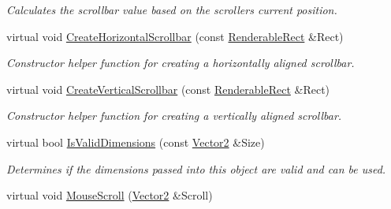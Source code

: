 \begin{DoxyCompactItemize}
\begin{DoxyCompactList}\small\item\em Calculates the scrollbar value based on the scrollers current position. \item\end{DoxyCompactList}\item 
\hypertarget{classphys_1_1UI_1_1Scrollbar_a4c42cf0a45ec4f59c9e6199fc2d3f0e3}{
virtual void \hyperlink{classphys_1_1UI_1_1Scrollbar_a4c42cf0a45ec4f59c9e6199fc2d3f0e3}{CreateHorizontalScrollbar} (const \hyperlink{structphys_1_1UI_1_1RenderableRect}{RenderableRect} \&Rect)}
\label{classphys_1_1UI_1_1Scrollbar_a4c42cf0a45ec4f59c9e6199fc2d3f0e3}

\begin{DoxyCompactList}\small\item\em Constructor helper function for creating a horizontally aligned scrollbar. \item\end{DoxyCompactList}\item 
\hypertarget{classphys_1_1UI_1_1Scrollbar_a762ec4462368f3921b0646b0edae7278}{
virtual void \hyperlink{classphys_1_1UI_1_1Scrollbar_a762ec4462368f3921b0646b0edae7278}{CreateVerticalScrollbar} (const \hyperlink{structphys_1_1UI_1_1RenderableRect}{RenderableRect} \&Rect)}
\label{classphys_1_1UI_1_1Scrollbar_a762ec4462368f3921b0646b0edae7278}

\begin{DoxyCompactList}\small\item\em Constructor helper function for creating a vertically aligned scrollbar. \item\end{DoxyCompactList}\item 
\hypertarget{classphys_1_1UI_1_1Scrollbar_a4953ac8c0b711ed9c1be468897e09ce8}{
virtual bool \hyperlink{classphys_1_1UI_1_1Scrollbar_a4953ac8c0b711ed9c1be468897e09ce8}{IsValidDimensions} (const \hyperlink{classphys_1_1Vector2}{Vector2} \&Size)}
\label{classphys_1_1UI_1_1Scrollbar_a4953ac8c0b711ed9c1be468897e09ce8}

\begin{DoxyCompactList}\small\item\em Determines if the dimensions passed into this object are valid and can be used. \item\end{DoxyCompactList}\item 
\hypertarget{classphys_1_1UI_1_1Scrollbar_ac50a2cd5b85c8b2ff0cabf22b898a0fa}{
virtual void \hyperlink{classphys_1_1UI_1_1Scrollbar_ac50a2cd5b85c8b2ff0cabf22b898a0fa}{MouseScroll} (\hyperlink{classphys_1_1Vector2}{Vector2} \&Scroll)}
\label{classphys_1_1UI_1_1Scrollbar_ac50a2cd5b85c8b2ff0cabf22b898a0fa}


\end{DoxyCompactItemize}
